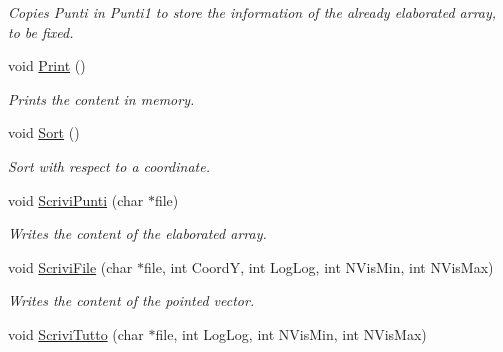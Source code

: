 \begin{DoxyCompactItemize}
\begin{DoxyCompactList}\small\item\em \-Copies \-Punti in \-Punti1 to store the information of the already elaborated array, to be fixed. \end{DoxyCompactList}\item 
\hypertarget{classVarDatFile_a9dcac18006ce057b8d78c847174c1362}{void \hyperlink{classVarDatFile_a9dcac18006ce057b8d78c847174c1362}{\-Print} ()}\label{classVarDatFile_a9dcac18006ce057b8d78c847174c1362}

\begin{DoxyCompactList}\small\item\em \-Prints the content in memory. \end{DoxyCompactList}\item 
\hypertarget{classVarDatFile_ae424c3360277f457eba79fd25b4eed3b}{void \hyperlink{classVarDatFile_ae424c3360277f457eba79fd25b4eed3b}{\-Sort} ()}\label{classVarDatFile_ae424c3360277f457eba79fd25b4eed3b}

\begin{DoxyCompactList}\small\item\em \-Sort with respect to a coordinate. \end{DoxyCompactList}\item 
\hypertarget{classVarDatFile_a15ad052575da97bec5b2bad38a52385e}{void \hyperlink{classVarDatFile_a15ad052575da97bec5b2bad38a52385e}{\-Scrivi\-Punti} (char $\ast$file)}\label{classVarDatFile_a15ad052575da97bec5b2bad38a52385e}

\begin{DoxyCompactList}\small\item\em \-Writes the content of the elaborated array. \end{DoxyCompactList}\item 
\hypertarget{classVarDatFile_acc513a8bb6bda4c6bbf7832a9dcdd19a}{void \hyperlink{classVarDatFile_acc513a8bb6bda4c6bbf7832a9dcdd19a}{\-Scrivi\-File} (char $\ast$file, int \-Coord\-Y, int \-Log\-Log, int \-N\-Vis\-Min, int \-N\-Vis\-Max)}\label{classVarDatFile_acc513a8bb6bda4c6bbf7832a9dcdd19a}

\begin{DoxyCompactList}\small\item\em \-Writes the content of the pointed vector. \end{DoxyCompactList}\item 
\hypertarget{classVarDatFile_aef5b55b7d54d1a01e9e507d3c4d23e4d}{void \hyperlink{classVarDatFile_aef5b55b7d54d1a01e9e507d3c4d23e4d}{\-Scrivi\-Tutto} (char $\ast$file, int \-Log\-Log, int \-N\-Vis\-Min, int \-N\-Vis\-Max)}\label{classVarDatFile_aef5b55b7d54d1a01e9e507d3c4d23e4d}


\end{DoxyCompactItemize}
